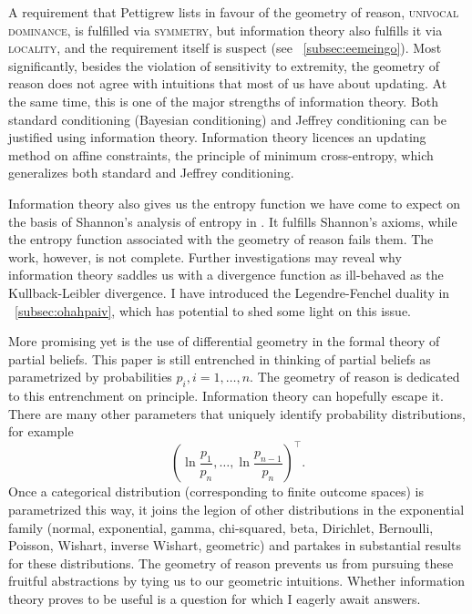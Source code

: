 \documentclass[12pt]{article}
\begin{document}
A requirement that Pettigrew lists in favour of the geometry of
reason, \textsc{univocal dominance}, is fulfilled via
\textsc{symmetry}, but information theory also fulfills it via
\textsc{locality}, and the requirement itself is suspect (see
{\ubsection}~\ref{subsec:eemeingo}). Most significantly, besides the
violation of sensitivity to extremity, the geometry of reason does not
agree with intuitions that most of us have about updating. At the same
time, this is one of the major strengths of information theory. Both
standard conditioning (Bayesian conditioning) and Jeffrey conditioning
can be justified using information theory. Information theory licences
an updating method on affine constraints, the principle of minimum
cross-entropy, which generalizes both standard and Jeffrey
conditioning.

Information theory also gives us the entropy function we have come to
expect on the basis of Shannon's analysis of entropy in
. It fulfills Shannon's axioms, while the
entropy function associated with the geometry of reason fails them.
The work, however, is not complete. Further investigations may reveal
why information theory saddles us with a divergence function as
ill-behaved as the Kullback-Leibler divergence. I have introduced the
Legendre-Fenchel duality in {\ubsection}~\ref{subsec:ohahpaiv}, which
has potential to shed some light on this issue.

More promising yet is the use of differential geometry in the formal
theory of partial beliefs. This paper is still entrenched in thinking
of partial beliefs as parametrized by probabilities
$p_{i},i=1,{\ldots},n$. The geometry of reason is dedicated to this
entrenchment on principle. Information theory can hopefully escape it.
There are many other parameters that uniquely identify probability
distributions, for example
\begin{equation}
  \label{eq:eemaepie}
  \left(\ln\frac{p_{1}}{p_{n}},{\ldots},\ln\frac{p_{n-1}}{p_{n}}\right)^{\intercal}.
\end{equation}
Once a categorical distribution (corresponding to finite outcome
spaces) is parametrized this way, it joins the legion of other
distributions in the exponential family (normal, exponential, gamma,
chi-squared, beta, Dirichlet, Bernoulli, Poisson, Wishart, inverse
Wishart, geometric) and partakes in substantial results for these
distributions. The geometry of reason prevents us from pursuing these
fruitful abstractions by tying us to our geometric intuitions. Whether
information theory proves to be useful is a question for which I
eagerly await answers.



% 

 

\end{document}
